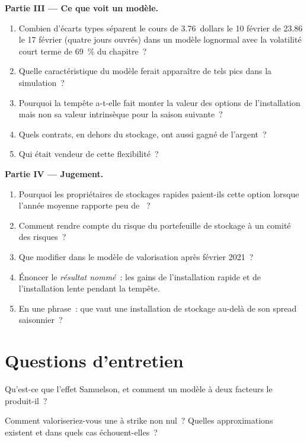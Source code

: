 \begin{problem}
\medskip\noindent\textbf{Partie III --- Ce que voit un modèle.}
\begin{enumerate}[resume]
\item Combien d'écarts types séparent le cours de 3.76~dollars le 10 février de 23.86
le 17 février (quatre jours ouvrés) dans un modèle lognormal avec la volatilité court terme
de 69~\% du chapitre~?
\item Quelle caractéristique du modèle ferait apparaître de tels pics dans la simulation~?
\item Pourquoi la tempête a-t-elle fait monter la valeur des options de l'installation
mais non sa valeur intrinsèque pour la saison suivante~?
\item Quels contrats, en dehors du stockage, ont aussi gagné de l'argent~?
\item Qui était vendeur de cette flexibilité~?
\end{enumerate}

\medskip\noindent\textbf{Partie IV --- Jugement.}
\begin{enumerate}[resume]
\item Pourquoi les propriétaires de stockages rapides paient-ils cette option lorsque l'année moyenne
rapporte peu de ~?
\item Comment rendre compte du risque du portefeuille de stockage à un comité des risques~?
\item Que modifier dans le modèle de valorisation après février 2021~?
\item Énoncer le \emph{résultat nommé}~: les gains de l'installation rapide et de l'installation lente
pendant la tempête.
\item En une phrase~: que vaut une installation de stockage au-delà de son spread saisonnier~?
\end{enumerate}
\end{problem}

\section{Questions d'entretien}

\begin{interviewq}\label{iq:rc:commodity-and-energy-derivatives:1}
Qu'est-ce que l'effet Samuelson, et comment un modèle à deux facteurs le produit-il~?
\end{interviewq}

\begin{interviewq}\label{iq:rc:commodity-and-energy-derivatives:2}
Comment valoriseriez-vous une  à strike non nul~? Quelles approximations existent
et dans quels cas échouent-elles~?
\end{interviewq}

